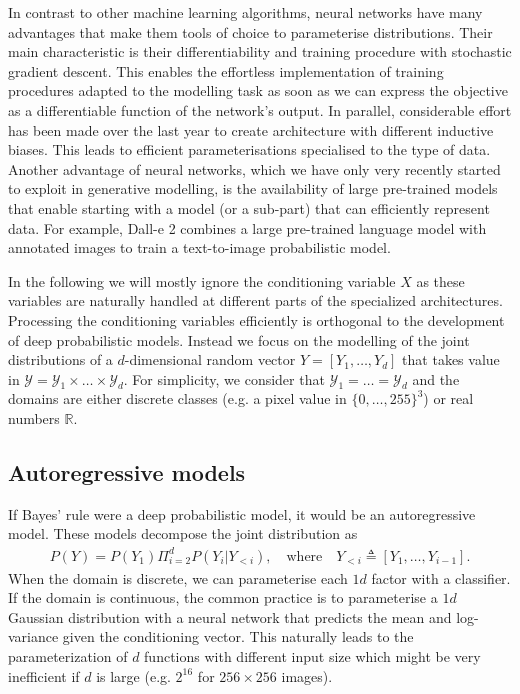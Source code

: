 In contrast to other machine learning algorithms, neural networks have many advantages that make them tools of choice to parameterise distributions. Their main characteristic is their differentiability and training procedure with stochastic gradient descent. This enables the effortless implementation of training procedures adapted to the modelling task as soon as we can express the objective as a differentiable function of the network's output. In parallel, considerable effort has been made over the last year to create architecture with different inductive biases. This leads to efficient parameterisations specialised to the type of data. Another advantage of neural networks, which we have only very recently started to exploit in generative modelling, is the availability of large pre-trained models that enable starting with a model (or a sub-part) that can efficiently represent data. For example, Dall-e 2 combines a large pre-trained language model with annotated images to train a text-to-image probabilistic model.

In the following we will mostly ignore the conditioning variable $X$ as these variables are naturally handled at different parts of the specialized architectures. Processing the conditioning variables efficiently is orthogonal to the development of deep probabilistic models. Instead we focus on the modelling of the joint distributions of a $d$-dimensional random vector $Y = \left[Y_1, \dots, Y_d  \right]$ that takes value in $\mathcal{Y} = \mathcal{Y}_1 \times \dots \times \mathcal{Y}_d$. For simplicity, we consider that $\mathcal{Y}_1 = \dots = \mathcal{Y}_d$ and the domains are either discrete classes (e.g. a pixel value in $\{0, \dots, 255\}^3$) or real numbers $\mathbb{R}$.
\subsection{Autoregressive models} \label{subsec:AM}
If Bayes' rule were a deep probabilistic model, it would be an autoregressive model. These models decompose the joint distribution as
\begin{align}
  P(Y) = P(Y_1) \Pi^d_{i=2} P(Y_i|Y_{<i}), \quad \text{where} \quad Y_{<i} \triangleq \left[ Y_1, \dots, Y_{i-1}\right].
\end{align}
When the domain is discrete, we can parameterise each $1d$ factor with a classifier. If the domain is continuous, the common practice is to parameterise a $1d$ Gaussian distribution with a neural network that predicts the mean and log-variance given the conditioning vector.
This naturally leads to the parameterization of $d$ functions with different input size which might be very inefficient if $d$ is large (e.g. $2^16$ for $256\times256$ images).


